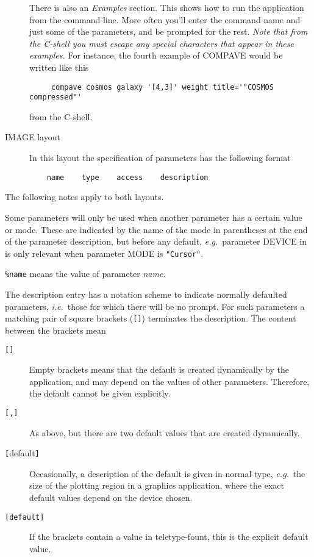 \documentclass[twoside,11pt,nolof]{starlink}
\begin{document}
\begin{description}
There is also an \emph{Examples\/} section. \label{ap:example}  This
shows how to run the application from the command line.  More often
you'll enter the command name and just some of the parameters, and be
prompted for the rest. \emph{Note that from the C-shell you must escape
any special characters that appear in these examples.} For instance,
the fourth example of COMPAVE would be written like this

\begin{verbatim}
     compave cosmos galaxy '[4,3]' weight title='"COSMOS compressed"'
\end{verbatim}

from the C-shell.

\item [IMAGE layout]
In this layout the specification of parameters has the following format
\begin{verbatim}
    name    type    access    description
\end{verbatim}
\end{description}
\medskip

The following notes apply to both layouts.

Some parameters will only be used when another parameter has a certain
value or mode. These are indicated by the name of the mode in
parentheses at the end of the parameter description, but before any
default, {\it{e.g.}}\ parameter DEVICE in 
is only relevant when parameter MODE is {\tt "Cursor"}.

{\tt \%name} means the value of parameter {\it name}.

The description entry has a notation scheme to indicate
normally defaulted parameters, {\it{i.e.}}\ those for which there will
be no prompt.
For such parameters a matching pair of square brackets ({\tt{[]}})
terminates the description.  The content between the brackets mean
\begin{description}
\item[{\tt{[]}}]
Empty brackets means that the default is created dynamically
by the application, and may depend on the values of other parameters.
Therefore, the default cannot be given explicitly.
\item[{\tt [,]}]
As above, but there are two default values that are created dynamically.
\item[{\tt [}{\rm default}{\tt{]}}]
Occasionally, a description of the default is given in normal type,
{\it{e.g.}}\ the size of the plotting region in a graphics application,
where the exact default values depend on the device chosen.
\item[{\tt [default]}]
If the brackets contain a value in teletype-fount, this is the explicit
default value.
\end{description}
\end{document}

